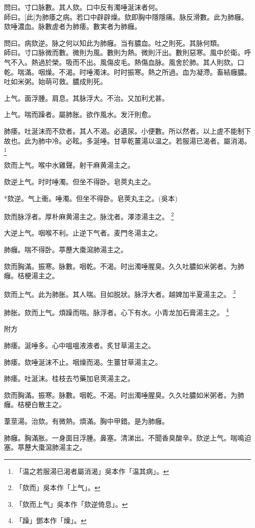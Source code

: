 \documentclass[12pt,twoside,UTF8,b5paper]{ctexbook}
\begin{document}
問曰。寸口脉數。其人欬。口中反有濁唾涎沫者何。\\
師曰。[此]为肺痿之病。若口中辟辟燥。欬即胸中隱隱痛。脉反滑數。此为肺癰。欬唾濃血。脉數虗者为肺痿。數実者为肺癰。

問曰。病欬逆。脉之何以知此为肺癰。当有膿血。吐之則死。其脉何類。\\
師曰。寸口脉微而數。微則为風。數則为熱。微則汗出。數則惡寒。風中於衛。呼气不入。熱過於榮。吸而不出。風傷皮毛。熱傷血脉。風舍於肺。其人則欬。口乾。喘滿。咽燥。不渴。时唾濁沫。时时振寒。熱之所過。血为凝滯。畜結癰膿。吐如米粥。始萌可救。膿成則死。

上气。面浮腫。肩息。其脉浮大。不治。又加利尤甚。

上气。喘而躁者。屬肺胀。欲作風水。发汗則愈。

肺痿。吐涎沫而不欬者。其人不渴。必遺尿。小便數。所以然者。以上虗不能制下故也。此为肺中冷。必眩。多涎唾。甘草乾薑湯以温之。若服湯已渴者。屬消渴。
	\footnote{「温之若服湯已渴者屬消渴」吳本作「温其病」。}

欬而上气。喉中水雞聲。射干麻黄湯主之。

欬逆上气。时时唾濁。但坐不得卧。皂莢丸主之。

*欬逆。气上衝。唾濁。但坐不得卧。皂莢丸主之。(吳本)

欬而脉浮者。厚朴麻黄湯主之。脉沈者。澤漆湯主之。
	\footnote{「欬而」吳本作「上气」。}

大逆上气。咽喉不利。止逆下气者。麦門冬湯主之。

肺癰。喘不得卧。葶藶大棗瀉肺湯主之。

欬而胸滿。振寒。脉數。咽乾。不渴。时出濁唾腥臭。久久吐膿如米粥者。为肺癰。桔梗湯主之。

欬而上气。此为肺胀。其人喘。目如脱狀。脉浮大者。越婢加半夏湯主之。
	\footnote{「欬而上气」吳本作「欬逆倚息」。}

肺胀。欬而上气。煩躁而喘。脉浮者。心下有水。小青龙加石膏湯主之。
	\footnote{「躁」鄧本作「燥」。}

附方

肺痿。涎唾多。心中嗢嗢液液者。炙甘草湯主之。

肺痿。欬唾涎沫不止。咽燥而渴。生薑甘草湯主之。

肺痿。吐涎沫。桂枝去芍藥加皂莢湯主之。

欬而胸滿。振寒。脉數。咽乾。不渴。时出濁唾腥臭。久久吐膿如米粥者。为肺癰。桔梗白散主之。

葦莖湯。治欬。有微熱。煩滿。胸中甲錯。是为肺癰。

肺癰。胸滿胀。一身面目浮腫。鼻塞。清涕出。不聞香臭酸辛。欬逆上气。喘鳴迫塞。葶藶大棗瀉肺湯主之。
\end{document}
